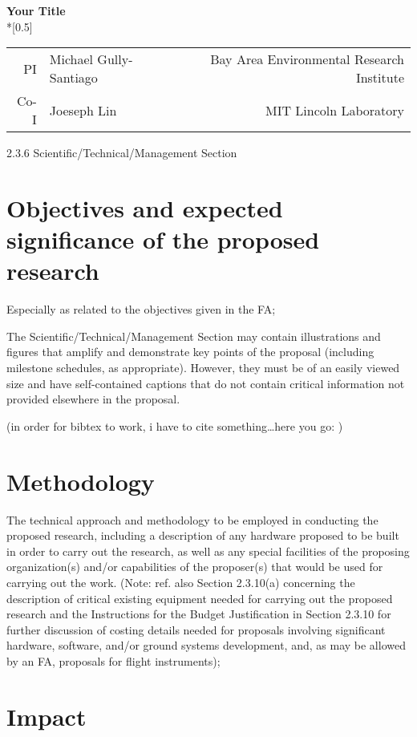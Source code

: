 \documentclass[12pt]{article}
\makeatletter
\renewcommand*{\maketitle}{
\begin{center}
  \begingroup
  \Large
  \textbf{Your Title} \\*[0.5\baselineskip]
  \normalsize
\begin{tabular}{r@{:\quad}lr}
          PI & Michael Gully-Santiago       & Bay Area Environmental Research Institute       \\
        Co-I & Joeseph Lin & MIT Lincoln Laboratory
\end{tabular}
  \endgroup
\end{center}
}
\makeatother
\begin{document}

\cleardoublepage
\setcounter{page}{1}


\maketitle

2.3.6 Scientific/Technical/Management Section

\section{Objectives and expected significance of the proposed research}
Especially as related to the objectives given in the FA;


The Scientific/Technical/Management Section may contain illustrations
and figures that amplify and demonstrate key points of the proposal
(including milestone schedules, as appropriate). However, they must be
of an easily viewed size and have self-contained captions that do not
contain critical information not provided elsewhere in the proposal.

(in order for bibtex to work, i have to cite something\ldots here you
go: \citealt{Einstein1936})


\section{Methodology}
\label{sec:method}
The technical approach and methodology to be employed in conducting
the proposed research, including a description of any hardware
proposed to be built in order to carry out the research, as well as
any special facilities of the proposing organization(s) and/or
capabilities of the proposer(s) that would be used for carrying out
the work. (Note: ref. also Section 2.3.10(a) concerning the
description of critical existing equipment needed for carrying out the
proposed research and the Instructions for the Budget Justification in
Section 2.3.10 for further discussion of costing details needed for
proposals involving significant hardware, software, and/or ground
systems development, and, as may be allowed by an FA, proposals for
flight instruments);

\section{Impact}
\end{document}
